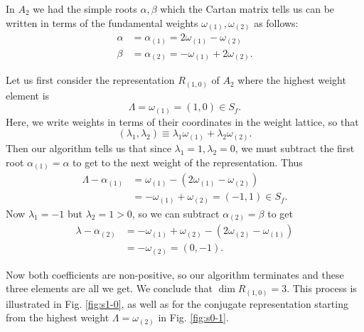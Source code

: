 \begin{exm}
In $A_2$ we had the simple roots $\alpha,\beta$ which the Cartan matrix tells us can be written in terms of the fundamental weights $\omega_{(1)},\omega_{(2)}$ as follows:
\begin{align*} \alpha&=\alpha_{(1)}=2\omega_{(1)}-\omega_{(2)}\\
\beta&=\alpha_{(2)}=-\omega_{(1)}+2\omega_{(2)}.
\end{align*}

Let us first consider the representation $R_{(1,0)}$ of $A_2$ where the highest weight element is
$$\Lambda=\omega_{(1)}=(1,0)\in S_f.$$ Here, we write weights in terms of their coordinates in the weight lattice, so that
$$(\lambda_1,\lambda_2)\equiv \lambda_1 \omega_{(1)}+\lambda_2 \omega_{(2)}.$$ Then our algorithm tells us that since $\lambda_1=1,\lambda_2=0$, we must subtract the first root $\alpha_{(1)}=\alpha$ to get to the next weight of the representation. Thus
\begin{align*}
    \Lambda-\alpha_{(1)}&=\omega_{(1)}-(2\omega_{(1)}-\omega_{(2)})\\
    &=-\omega_{(1)}+\omega_{(2)} =(-1,1)\in S_f.
\end{align*}
Now $\lambda_1=-1$ but $\lambda_2=1 > 0$, so we can subtract $\alpha_{(2)}=\beta$ to get 
\begin{align*}
    \lambda-\alpha_{(2)}&=-\omega_{(1)}+\omega_{(2)}-(2\omega_{(2)}-\omega_{(1)})\\
    &=-\omega_{(2)}=(0,-1).
\end{align*}

Now both coefficients are non-positive, so our algorithm terminates and these three elements are all we get. We conclude that $\dim R_{(1,0)}=3$. This process is illustrated in Fig. \ref{fig:s1-0}, as well as for the conjugate representation starting from the highest weight $\Lambda=\omega_{(2)}$ in Fig. \ref{fig:s0-1}.
\end{exm}

